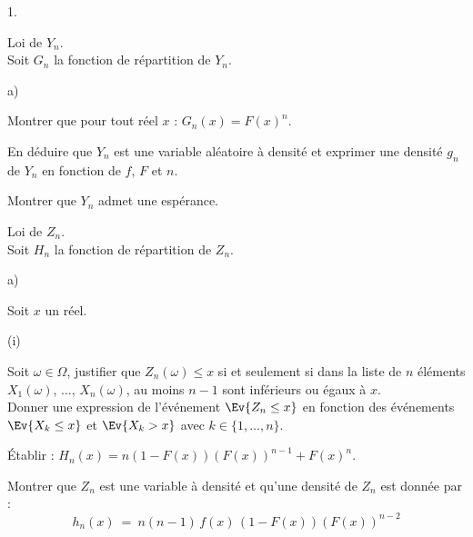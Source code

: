 \begin{noliste}{1.}
  \setlength{\itemsep}{4mm}
  \item Loi de $Y_n$.\\
  Soit $G_n$ la fonction de répartition de $Y_n$.
  \begin{noliste}{a)}
    \setlength{\itemsep}{2mm}
    \item Montrer que pour tout réel $x$ : $G_n(x)=F(x)^n$.
    
    
    
    

    
    \item En déduire que $Y_n$ est une variable aléatoire à densité 
    et exprimer une densité $g_n$ de $Y_n$ en fonction de $f$, $F$
    et $n$.
    
    

    
    \item Montrer que $Y_n$ admet une espérance.
    
    
  \end{noliste}
  
  
  
  
  \item Loi de $Z_n$.\\
  Soit $H_n$ la fonction de répartition de $Z_n$.
  \begin{noliste}{a)}
    \setlength{\itemsep}{2mm}
    \item Soit $x$ un réel.
    \begin{nonoliste}{(i)}
      \item Soit $\omega \in \Omega$, justifier que $Z_n(\omega) \leq x$
      si et seulement si dans la liste de $n$ éléments $X_1(\omega)$,
      $\ldots$, $X_n(\omega)$, au moins $n-1$ sont inférieurs ou égaux
      à $x$.\\
      Donner une expression de l'événement $\Ev{Z_n \leq x}$ en 
      fonction des événements $\Ev{X_k \leq x}$ et $\Ev{X_k >x}$ avec
      $k \in \{1, \ldots, n \}$.
      
      
      
      

      
      \item Établir : $H_n(x) = n(1-F(x))(F(x))^{n-1} + F(x)^n$.
      
      

    \end{nonoliste}
    
    \item Montrer que $Z_n$ est une variable à densité et qu'une 
    densité de $Z_n$ est donnée par :
    \[
      h_n(x) \ = \ n(n-1) \, f(x) \, (1-F(x))(F(x))^{n-2}
    \]
    

\end{noliste}
\end{noliste}
